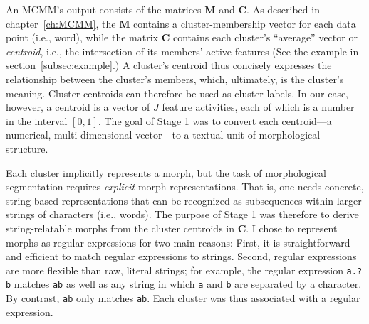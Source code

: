 {%


An MCMM's output consists of 
the matrices $\mathbf{M}$ and $\mathbf{C}$. As described in 
chapter~\ref{ch:MCMM}, the $\mathbf{M}$ contains a cluster-membership 
vector for each data point (i.e., word), while the matrix $\mathbf{C}$ contains 
each cluster's ``average'' vector or \emph{centroid}, i.e., the intersection 
of its members' active features (See the example in section~\ref{subsec:example}.)
A cluster's centroid thus concisely expresses the relationship between the cluster's members, which, ultimately, is the cluster's meaning. 
Cluster centroids can therefore be used as cluster labels. In our case, however, a centroid is a vector of $J$ feature activities, each of which is a number in the interval $[0,1]$. 
The goal of Stage 1 was to convert each centroid---a numerical, 
multi-dimensional vector---to a textual unit of morphological structure.

Each cluster implicitly represents a morph, but the task of morphological 
segmentation requires \emph{explicit} morph representations. 
 That is, one needs concrete, string-based representations that can be recognized 
 as subsequences within larger strings of characters (i.e., words). 
The purpose of Stage 1 was therefore to derive string-relatable morphs from the cluster centroids in $\mathbf{C}$.
I chose to represent morphs as regular expressions for two main reasons: First, it is straightforward and efficient to match regular expressions to strings. Second, regular expressions are more flexible than raw, literal strings; for example, the regular expression 
\texttt{a.?b} matches \texttt{ab} as well as any string in which
\texttt{a} and \texttt{b} are separated by a character. By contrast, \texttt{ab} only matches \texttt{ab}.  
Each cluster was thus associated with a regular expression. 

}

